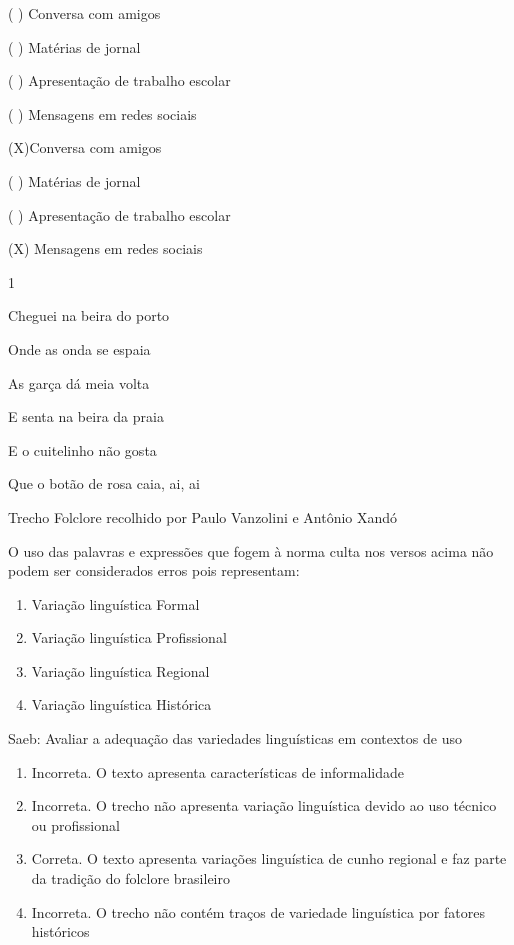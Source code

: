 {{\begin{itemize}
\begin{itemize}
( ) Conversa com amigos

( ) Matérias de jornal

( ) Apresentação de trabalho escolar

( ) Mensagens em redes sociais

(X)Conversa com amigos

( ) Matérias de jornal

( ) Apresentação de trabalho escolar

(X) Mensagens em redes sociais


\num{1}

Cheguei na beira do porto

Onde as onda se espaia

As garça dá meia volta

E senta na beira da praia

E o cuitelinho não gosta

Que o botão de rosa caia, ai, ai

Trecho Folclore recolhido por Paulo Vanzolini e Antônio Xandó

O uso das palavras e expressões que fogem à norma culta nos versos acima
não podem ser considerados erros pois representam:

\begin{enumerate}
\def\labelenumi{\alph{enumi})}
\item
  Variação linguística Formal
\item
  Variação linguística Profissional
\item
  Variação linguística Regional
\item
  Variação linguística Histórica
\end{enumerate}

Saeb: Avaliar a adequação das variedades linguísticas em contextos de
uso

\begin{enumerate}
\def\labelenumi{\arabic{enumi}.}
\item
  Incorreta. O texto apresenta características de informalidade
\item
  Incorreta. O trecho não apresenta variação linguística devido ao uso
  técnico ou profissional
\item
  Correta. O texto apresenta variações linguística de cunho regional e
  faz parte da tradição do folclore brasileiro
\item
  Incorreta. O trecho não contém traços de variedade linguística por
  fatores históricos
\end{enumerate}


\end{itemize}
\end{itemize}}}
